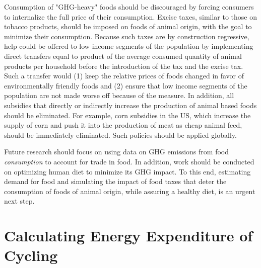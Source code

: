 \documentclass{article}[12pt,letterpaper]
\begin{document}
Consumption of "GHG-heavy" foods should be discouraged by forcing consumers to internalize the full price of their consumption. Excise taxes, similar to those on tobacco products, should be imposed on foods of animal origin, with the goal to minimize their consumption. Because such taxes are by construction regressive, help could be offered to low income segments of the population by implementing direct transfers equal to product of the average consumed quantity of animal products per household before the introduction of the tax and the excise tax. Such a transfer would (1) keep the relative prices of foods changed in favor of environmentally friendly foods and (2) ensure that low income segments of the population are not made worse off because of the measure. In addition, all subsidies that directly or indirectly increase the production of animal based foods should be eliminated. For example, corn subsidies in the US, which increase the supply of corn and push it into the production of meat as cheap animal feed, should be immediately eliminated. Such policies should be applied globally.

Future research should focus on using data on GHG emissions from food {\em consumption} to account for trade in food. In addition, work should be conducted on optimizing human diet to minimize its GHG impact. To this end, estimating demand for food and simulating the impact of food taxes that deter the consumption of foods of animal origin, while assuring a healthy diet, is an urgent next step.

\printbibliography
\newpage

\appendix
\section{Calculating Energy Expenditure of Cycling}
\end{document}
